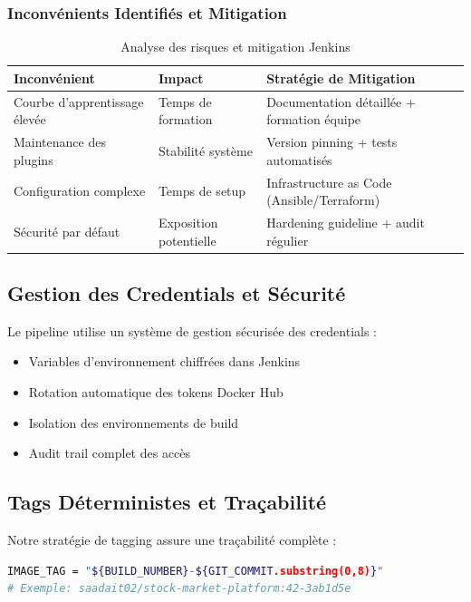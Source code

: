 \documentclass[12pt,a4paper]{report}
\begin{document}
\subsubsection{Inconvénients Identifiés et Mitigation}

\begin{table}[H]
    \centering
    \begin{tabularx}{\textwidth}{|X|X|X|}
        \hline
        \textbf{Inconvénient} & \textbf{Impact} & \textbf{Stratégie de Mitigation} \\
        \hline
        Courbe d'apprentissage élevée & Temps de formation & Documentation détaillée + formation équipe \\
        \hline
        Maintenance des plugins & Stabilité système & Version pinning + tests automatisés \\
        \hline
        Configuration complexe & Temps de setup & Infrastructure as Code (Ansible/Terraform) \\
        \hline
        Sécurité par défaut & Exposition potentielle & Hardening guideline + audit régulier \\
        \hline
    \end{tabularx}
    \caption{Analyse des risques et mitigation Jenkins}
\end{table}

\subsection{Gestion des Credentials et Sécurité}

Le pipeline utilise un système de gestion sécurisée des credentials :
\begin{itemize}
    \item Variables d'environnement chiffrées dans Jenkins
    \item Rotation automatique des tokens Docker Hub
    \item Isolation des environnements de build
    \item Audit trail complet des accès
\end{itemize}

\subsection{Tags Déterministes et Traçabilité}

Notre stratégie de tagging assure une traçabilité complète :
\begin{lstlisting}[language=bash]
IMAGE_TAG = "${BUILD_NUMBER}-${GIT_COMMIT.substring(0,8)}"
# Exemple: saadait02/stock-market-platform:42-3ab1d5e
\end{lstlisting}
\end{document}
